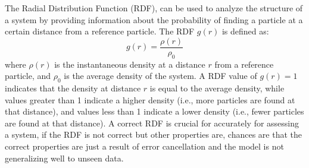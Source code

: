 The Radial Distribution Function (RDF), can be used to analyze the structure of a system by providing information about the probability of finding a particle at a certain distance from a reference particle. The RDF \(g(r)\) is defined as:
\begin{equation}
    g(r) = \frac{\rho(r)}{\rho_0}
\end{equation}
where \(\rho(r)\) is the instantaneous density at a distance \(r\) from a reference particle, and \(\rho_0\) is the average density of the system.
A RDF value of \(g(r) = 1\) indicates that the density at distance \(r\) is equal to the average density, while values greater than 1 indicate a higher density (i.e., more particles are found at that distance), and values less than 1 indicate a lower density (i.e., fewer particles are found at that distance).
A correct RDF is crucial for accurately for assessing a system, if the RDF is not correct but other properties are, chances are that the correct properties are just a result of error cancellation and the model is not generalizing well to unseen data.